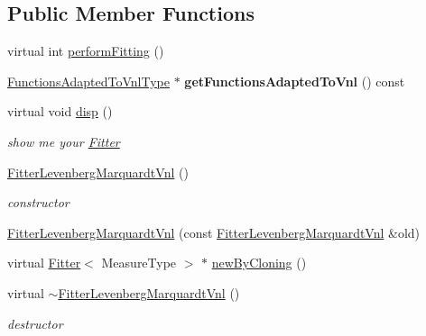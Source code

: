 \subsection*{Public Member Functions}
\begin{DoxyCompactItemize}
\item 
virtual int \hyperlink{class_ox_1_1_fitter_levenberg_marquardt_vnl_a533dee878077bfb6f4c9a88db47a15b9}{perform\-Fitting} ()
\item 
\hypertarget{class_ox_1_1_fitter_levenberg_marquardt_vnl_ac78e452d33f8b4271d4e12cd85be358d}{\hyperlink{class_ox_1_1_functions_t1_adapter_vnl_least_squares}{Functions\-Adapted\-To\-Vnl\-Type} $\ast$ {\bfseries get\-Functions\-Adapted\-To\-Vnl} () const }\label{class_ox_1_1_fitter_levenberg_marquardt_vnl_ac78e452d33f8b4271d4e12cd85be358d}

\item 
\hypertarget{class_ox_1_1_fitter_levenberg_marquardt_vnl_a913e232a11c4e235e22a3745aaacc93f}{virtual void \hyperlink{class_ox_1_1_fitter_levenberg_marquardt_vnl_a913e232a11c4e235e22a3745aaacc93f}{disp} ()}\label{class_ox_1_1_fitter_levenberg_marquardt_vnl_a913e232a11c4e235e22a3745aaacc93f}

\begin{DoxyCompactList}\small\item\em show me your \hyperlink{class_ox_1_1_fitter}{Fitter} \end{DoxyCompactList}\item 
\hypertarget{class_ox_1_1_fitter_levenberg_marquardt_vnl_a44c6eac39272631fd170ddd12d38eb2f}{\hyperlink{class_ox_1_1_fitter_levenberg_marquardt_vnl_a44c6eac39272631fd170ddd12d38eb2f}{Fitter\-Levenberg\-Marquardt\-Vnl} ()}\label{class_ox_1_1_fitter_levenberg_marquardt_vnl_a44c6eac39272631fd170ddd12d38eb2f}

\begin{DoxyCompactList}\small\item\em constructor \end{DoxyCompactList}\item 
\hyperlink{class_ox_1_1_fitter_levenberg_marquardt_vnl_a382e555967b29cb5299cffab29656995}{Fitter\-Levenberg\-Marquardt\-Vnl} (const \hyperlink{class_ox_1_1_fitter_levenberg_marquardt_vnl}{Fitter\-Levenberg\-Marquardt\-Vnl} \&old)
\item 
virtual \hyperlink{class_ox_1_1_fitter}{Fitter}$<$ Measure\-Type $>$ $\ast$ \hyperlink{class_ox_1_1_fitter_levenberg_marquardt_vnl_a196dd40b911c2b916e303205ccf8121a}{new\-By\-Cloning} ()
\item 
\hypertarget{class_ox_1_1_fitter_levenberg_marquardt_vnl_ae210e0ae7b19f15170cb455d1bec0d9d}{virtual \hyperlink{class_ox_1_1_fitter_levenberg_marquardt_vnl_ae210e0ae7b19f15170cb455d1bec0d9d}{$\sim$\-Fitter\-Levenberg\-Marquardt\-Vnl} ()}\label{class_ox_1_1_fitter_levenberg_marquardt_vnl_ae210e0ae7b19f15170cb455d1bec0d9d}

\begin{DoxyCompactList}\small\item\em destructor \end{DoxyCompactList}\end{DoxyCompactItemize}
